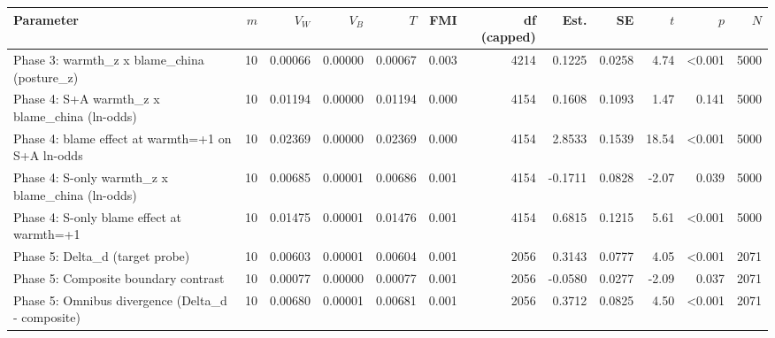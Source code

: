 \begin{tabular}{lrrrrrrrrrrr}
\toprule
Parameter & $m$ & $V_W$ & $V_B$ & $T$ & FMI & df (capped) & Est. & SE & $t$ & $p$ & $N$ \\
\midrule
Phase 3: warmth\_z x blame\_china (posture\_z) & 10 & 0.00066 & 0.00000 & 0.00067 & 0.003 & 4214 & 0.1225 & 0.0258 & 4.74 & <0.001 & 5000 \\
Phase 4: S+A warmth\_z x blame\_china (ln-odds) & 10 & 0.01194 & 0.00000 & 0.01194 & 0.000 & 4154 & 0.1608 & 0.1093 & 1.47 & 0.141 & 5000 \\
Phase 4: blame effect at warmth=+1 on S+A ln-odds & 10 & 0.02369 & 0.00000 & 0.02369 & 0.000 & 4154 & 2.8533 & 0.1539 & 18.54 & <0.001 & 5000 \\
Phase 4: S-only warmth\_z x blame\_china (ln-odds) & 10 & 0.00685 & 0.00001 & 0.00686 & 0.001 & 4154 & -0.1711 & 0.0828 & -2.07 & 0.039 & 5000 \\
Phase 4: S-only blame effect at warmth=+1 & 10 & 0.01475 & 0.00001 & 0.01476 & 0.001 & 4154 & 0.6815 & 0.1215 & 5.61 & <0.001 & 5000 \\
Phase 5: Delta\_d (target probe) & 10 & 0.00603 & 0.00001 & 0.00604 & 0.001 & 2056 & 0.3143 & 0.0777 & 4.05 & <0.001 & 2071 \\
Phase 5: Composite boundary contrast & 10 & 0.00077 & 0.00000 & 0.00077 & 0.001 & 2056 & -0.0580 & 0.0277 & -2.09 & 0.037 & 2071 \\
Phase 5: Omnibus divergence (Delta\_d - composite) & 10 & 0.00680 & 0.00001 & 0.00681 & 0.001 & 2056 & 0.3712 & 0.0825 & 4.50 & <0.001 & 2071 \\
\bottomrule
\end{tabular}
